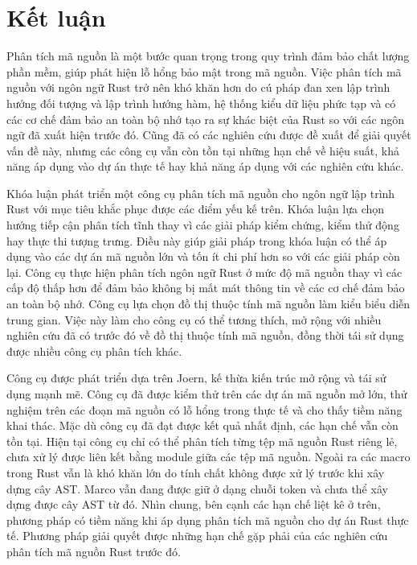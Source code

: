 \chapter*{Kết luận}

Phân tích mã nguồn là một bước quan trọng trong quy trình đảm bảo chất lượng phần mềm, giúp phát hiện lỗ hổng bảo mật trong mã nguồn.
Việc phân tích mã nguồn với ngôn ngữ Rust trở nên khó khăn hơn do cú pháp đan xen lập trình hướng đối tượng và lập trình hướng hàm, hệ thống kiểu dữ liệu phức tạp và có các cơ chế đảm bảo an toàn bộ nhớ tạo ra sự khác biệt của Rust so với các ngôn ngữ đã xuất hiện trước đó.
Cũng đã có các nghiên cứu được đề xuất để giải quyết vấn đề này, nhưng các công cụ vẫn còn tồn tại những hạn chế về hiệu suất, khả năng áp dụng vào dự án thực tế hay khả năng áp dụng với các nghiên cứu khác.

Khóa luận phát triển một công cụ phân tích mã nguồn cho ngôn ngữ lập trình Rust với mục tiêu khắc phục được các điểm yếu kế trên.
Khóa luận lựa chọn hướng tiếp cận phân tích tĩnh thay vì các giải pháp kiểm chứng, kiểm thử động hay thực thi tượng trưng.
Điều này giúp giải pháp trong khóa luận có thể áp dụng vào các dự án mã nguồn lớn và tốn ít chi phí hơn so với các giải pháp còn lại.
Công cụ thực hiện phân tích ngôn ngữ Rust ở mức độ mã nguồn thay vì các cấp độ thấp hơn để đảm bảo không bị mất mát thông tin về các cơ chế đảm bảo an toàn bộ nhớ.
Công cụ lựa chọn đồ thị thuộc tính mã nguồn làm kiểu biểu diễn trung gian.
Việc này làm cho công cụ có thể tương thích, mở rộng với nhiều nghiên cứu đã có trước đó về đồ thị thuộc tính mã nguồn, đồng thời tái sử dụng được nhiều công cụ phân tích khác.

Công cụ được phát triển dựa trên Joern, kế thừa kiến trúc mở rộng và tái sử dụng mạnh mẽ.
Công cụ đã được kiểm thử trên các dự án mã nguồn mở lớn, thử nghiệm trên các đoạn mã nguồn có lỗ hổng trong thực tế và cho thấy tiềm năng khai thác.
Mặc dù công cụ đã đạt được kết quả nhất định, các hạn chế vẫn còn tồn tại.
Hiện tại công cụ chỉ có thể phân tích từng tệp mã nguồn Rust riêng lẻ, chưa xử lý được liên kết bằng module giữa các tệp mã nguồn.
Ngoài ra các macro trong Rust vẫn là khó khăn lớn do tính chất không được xử lý trước khi xây dựng cây AST.
Marco vẫn đang được giữ ở dạng chuỗi token và chưa thể xây dựng được cây AST từ đó.
Nhìn chung, bên cạnh các hạn chế liệt kê ở trên, phương pháp có tiềm năng khi áp dụng phân tích mã nguồn cho dự án Rust thực tế.
Phương pháp giải quyết được những hạn chế gặp phải của các nghiên cứu phân tích mã nguồn Rust trước đó.

